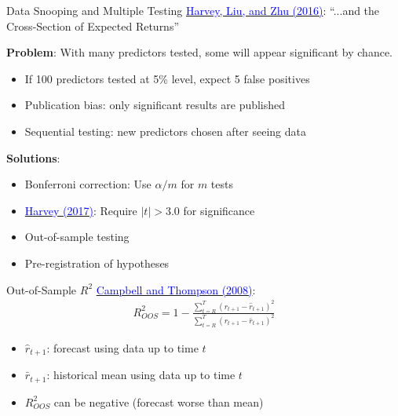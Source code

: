 \documentclass{beamer}
\begin{document}
\begin{frame}{Data Snooping and Multiple Testing}
	\href{https://doi.org/10.1093/rfs/hhv059}{\textcolor{blue}{Harvey, Liu, and Zhu (2016)}}: ``...and the Cross-Section of Expected Returns''
	
	\vspace{5pt}
	\textbf{Problem}: With many predictors tested, some will appear significant by chance.
	\begin{itemize}
		\item If 100 predictors tested at 5\% level, expect 5 false positives
		\item Publication bias: only significant results are published
		\item Sequential testing: new predictors chosen after seeing data
	\end{itemize}
	
	\vspace{5pt}
	\textbf{Solutions}:
	\begin{itemize}
		\item Bonferroni correction: Use $\alpha/m$ for $m$ tests
		\item \href{https://doi.org/10.1111/jofi.12530}{\textcolor{blue}{Harvey (2017)}}: Require $|t| > 3.0$ for significance
		\item Out-of-sample testing
		\item Pre-registration of hypotheses
	\end{itemize}
\end{frame}

\begin{frame}{Out-of-Sample $R^2$}
	\href{https://doi.org/10.1093/rfs/hhm055}{\textcolor{blue}{Campbell and Thompson (2008)}}:
	\begin{align*}
		R^2_{OOS} = 1 - \frac{\sum_{t=R}^{T}(r_{t+1} - \hat{r}_{t+1})^2}{\sum_{t=R}^{T}(r_{t+1} - \bar{r}_{t+1})^2}
	\end{align*}
	
	\begin{itemize}
		\item $\hat{r}_{t+1}$: forecast using data up to time $t$
		\item $\bar{r}_{t+1}$: historical mean using data up to time $t$
		\item $R^2_{OOS}$ can be \alert{negative} (forecast worse than mean)
	\end{itemize}
\end{frame}
\end{document}
